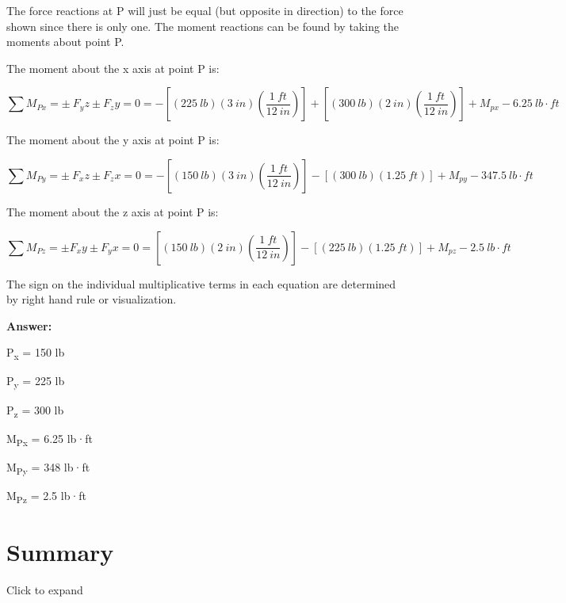 \documentclass[
  letterpaper,
  DIV=11,
  numbers=noendperiod]{scrreprt}
\theoremstyle{definition}
\theoremstyle{remark}
\begin{document}
\begin{tcolorbox}
\begin{tcolorbox}
The force reactions at P will just be equal (but opposite in direction)
to the force shown since there is only one. The moment reactions can be
found by taking the moments about point P.

The moment about the x axis at point P is:

\[
\sum M_{Px} = \pm ~F_yz \pm F_zy = 0 = -[(225{~lb})(3{~in})(\frac{1{~ft}}{12{~in}})]+[(300{~lb})(2{~in})(\frac{1{~ft}}{12{~in}})]+M_{px} -6.25{~lb·ft}
\]

The moment about the y axis at point P is:

\[
\sum M_{Py} = \pm ~F_xz \pm F_zx = 0 = -[(150{~lb})(3{~in})(\frac{1{~ft}}{12{~in}})]-[(300{~lb})(1.25{~ft})]+M_{py} -347.5{~lb·ft}
\]

The moment about the z axis at point P is:

\[
\sum M_{Pz} = \pm F_xy \pm F_yx = 0 = [(150{~lb})(2{~in})(\frac{1{~ft}}{12{~in}})]-[(225{~lb})(1.25{~ft})]+M_{pz} -2.5{~lb·ft}
\]

The sign on the individual multiplicative terms in each equation are
determined by right hand rule or visualization.

\textbf{Answer:}

P\textsubscript{x} = 150 lb

P\textsubscript{y} = 225 lb

P\textsubscript{z} = 300 lb

M\textsubscript{Px} = 6.25 lb·ft

M\textsubscript{Py} = 348 lb·ft

M\textsubscript{Pz} = 2.5 lb·ft

\end{tcolorbox}

\end{tcolorbox}

\section*{Summary}\label{summary}


Click to expand
\end{document}
